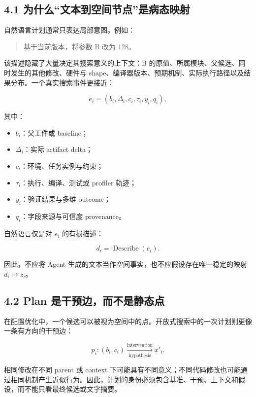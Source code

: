 \documentclass[
  11pt]{ctexart}
\providecommand{\tightlist}{%
  \setlength{\itemsep}{0pt}\setlength{\parskip}{0pt}}
\begin{document}
\subsection{4.1
为什么``文本到空间节点''是病态映射}\label{ux4e3aux4ec0ux4e48ux6587ux672cux5230ux7a7aux95f4ux8282ux70b9ux662fux75c5ux6001ux6620ux5c04}

自然语言计划通常只表达局部意图。例如：

\begin{quote}
基于当前版本，将参数 B 改为 128。
\end{quote}

该描述隐藏了大量决定其搜索意义的上下文：B
的原值、所属模块、父候选、同时发生的其他修改、硬件与
shape、编译器版本、预期机制、实际执行路径以及结果分布。一个真实搜索事件更接近：

\[
e_i=(b_i,\Delta_i,c_i,\tau_i,y_i,q_i),
\]

其中：

\begin{itemize}
\tightlist
\item
  \(b_i\)：父工件或 baseline；
\item
  \(\Delta_i\)：实际 artifact delta；
\item
  \(c_i\)：环境、任务实例与约束；
\item
  \(\tau_i\)：执行、编译、测试或 profiler 轨迹；
\item
  \(y_i\)：验证结果与多维 outcome；
\item
  \(q_i\)：字段来源与可信度 provenance。
\end{itemize}

自然语言仅是对 \(e_i\) 的有损描述：

\[
d_i=\operatorname{Describe}(e_i).
\]

因此，不应将 Agent 生成的文本当作空间事实，也不应假设存在唯一稳定的映射
\(d_i \mapsto z_i\)。

\subsection{4.2 Plan
是干预边，而不是静态点}\label{plan-ux662fux5e72ux9884ux8fb9ux800cux4e0dux662fux9759ux6001ux70b9}

在配置优化中，一个候选可以被视为空间中的点。开放式搜索中的一次计划则更像一条有方向的干预边：

\[
p_i:(b_i,c_i)
\xrightarrow[\text{hypothesis}]{\text{intervention}}
 x'_i.
\]

相同修改在不同 parent 或 context
下可能具有不同意义；不同代码修改也可能通过相同机制产生近似行为。因此，计划的身份必须包含基准、干预、上下文和假设，而不能只看最终候选或文字摘要。
\end{document}
